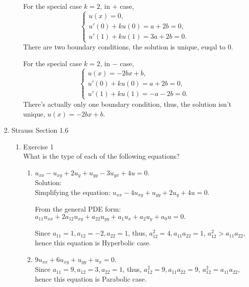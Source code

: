 \documentclass[12pt]{article}%
\begin{document}
\begin{enumerate}
\begin{enumerate}
For the special case $k=2$, in $+$ case, 
\begin{equation*}
    \begin{cases}
        u(x)=0,
        \\
        u'\left(0\right) + ku\left(0\right) = a+2b = 0,
        \\
        u'\left(1\right) + ku\left(1\right) = 3a+2b = 0.
    \end{cases}
\end{equation*}
There are two boundary conditions, the solution is unique, euqal to 0.

For the special case $k=2$, in $-$ case,
\begin{equation*}
    \begin{cases}
        u(x)=-2bx+b,
        \\
        u'\left(0\right) + ku\left(0\right) = a+2b = 0,
        \\
        u'\left(1\right) + ku\left(1\right) = -a-2b = 0.
    \end{cases}
\end{equation*}
There's actually only one boundary condition, thus, the solution isn't unique, $u(x)=-2bx+b$.
    \end{enumerate}

    \pagebreak
    
    \item Strauss Section 1.6 \smallskip
    \begin{enumerate}
        \item Exercise 1 \smallskip \\
        What is the type of each of the following equations?
        \begin{enumerate}
            \item $u_{xx} - u_{xy} + 2u_y+u_{yy}-3u_{yx} + 4u = 0$. \smallskip \\
        Solution:\\
        Simplifying the equation: $u_{xx} - 4u_{xy} +u_{yy}+ 2u_y + 4u = 0.$
        
        From the general PDE form: $a_{11}u_{xx}+2a_{12}u_{xy}+a_{22}u_{yy}+a_{1}u_{x}+a_{2}u_{y}+a_{0}u=0.$
        
        Since $a_{11}=1,a_{12}=-2,a_{22}=1$, thus, $a_{12}^2=4, a_{11}a_{22}=1$, $a_{12}^2>a_{11}a_{22}$, hence this equation is Hyperbolic case.
            
            \item $9u_{xx} + 6u_{xy} + u_{yy} + u_x = 0$. \smallskip \\
            Since $a_{11}=9,a_{12}=3,a_{22}=1$, thus, $a_{12}^2=9, a_{11}a_{22}=9$, $a_{12}^2=a_{11}a_{22}$, hence this equation is Parabolic case.
        

\end{enumerate}
\end{enumerate}
\end{enumerate}
\end{document}
